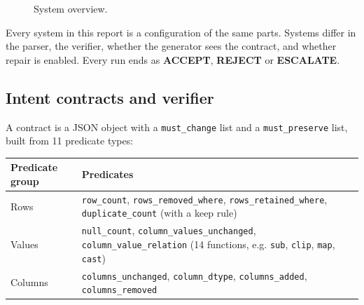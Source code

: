 \documentclass[11pt]{article}
\begin{document}
\begin{figure}[t]
\caption{System overview.}
\label{fig:overview}
\end{figure}




Every system in this report is a configuration of the same parts.
Systems differ in the parser, the verifier, whether the generator sees
the contract, and whether repair is enabled. Every run ends as
\textbf{ACCEPT}, \textbf{REJECT} or \textbf{ESCALATE}.

\subsection{Intent contracts and verifier}

A contract is a JSON object with a \texttt{must\_\allowbreak{}change}
list and a \texttt{must\_\allowbreak{}preserve} list, built from 11
predicate types:

\begin{table}[!tp]
\centering\footnotesize\setlength{\tabcolsep}{3pt}\renewcommand{\arraystretch}{1.1}
\begin{tabularx}{\textwidth}{l>{\raggedright\arraybackslash}X}
\toprule
\textbf{Predicate group} & \textbf{Predicates} \\
\midrule
Rows & \texttt{row\_\allowbreak{}count}, \texttt{rows\_\allowbreak{}removed\_\allowbreak{}where}, \texttt{rows\_\allowbreak{}retained\_\allowbreak{}where}, \texttt{duplicate\_\allowbreak{}count} (with a keep rule) \\
Values & \texttt{null\_\allowbreak{}count}, \texttt{column\_\allowbreak{}values\_\allowbreak{}unchanged}, \texttt{column\_\allowbreak{}value\_\allowbreak{}relation} (14 functions, e.g. \texttt{sub}, \texttt{clip}, \texttt{map}, \texttt{cast}) \\
Columns & \texttt{columns\_\allowbreak{}unchanged}, \texttt{column\_\allowbreak{}dtype}, \texttt{columns\_\allowbreak{}added}, \texttt{columns\_\allowbreak{}removed} \\
\bottomrule
\end{tabularx}
\end{table}
\end{document}
